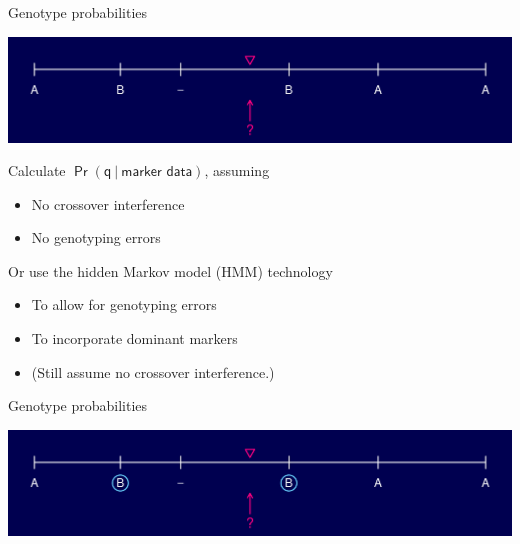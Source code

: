 \documentclass[12pt]{article}
\newcommand{\headsize}{\fontsize{35}{35} \selectfont}
\newcommand{\smallersize}{\fontsize{20}{25} \selectfont}
\begin{document}
\newpage

\addtocounter{page}{-1}

\headsize \color{myyellow}
\hfill \begin{minipage}{5.75in}
\centering
Genotype probabilities
\end{minipage}

\vspace{15mm}

\centerline{\includegraphics{Figs/genoprob5.pdf}}

\vspace{15mm}

\hfill
\begin{minipage}{10in}
\color{mywhite} \smallersize
Calculate {\color{myblue} $\mathsf{\Pr(q \ | \ \text{marker data})}$}, assuming
\begin{itemize}
\item No crossover interference
\item No genotyping errors
\end{itemize}

\vspace{10mm}

Or use the {\color{mypink} hidden Markov model (HMM)} technology
\begin{itemize}
\item To allow for genotyping errors
\item To incorporate dominant markers
\item {\color{myblue} (Still assume no crossover interference.)}
\end{itemize}
\end{minipage}


\newpage

\addtocounter{page}{-1}

\headsize \color{myyellow}
\hfill \begin{minipage}{5.75in}
\centering
Genotype probabilities
\end{minipage}

\vspace{15mm}

\centerline{\includegraphics{Figs/genoprob6.pdf}}
\end{document}
